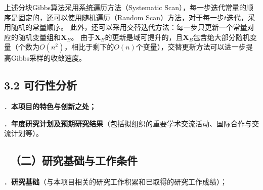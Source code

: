 \documentclass[12pt,UTF8,AutoFakeBold=3,a4paper]{ctexart} %
\begin{document}
上述分块Gibbs算法采用系统遍历方法（Systematic Scan），每一步迭代常量的顺序是固定的，还可以使用随机遍历（Random Scan）方法，对于每一步$t$迭代，采用随机的常量顺序。
此外，还可以采用交替迭代方法：每一步只更新一个常量对应的随机变量组和$\mathbf{X}_B$。
由于$\mathbf{X}_B$的更新是域可提升的，且$\mathbf{X}_B$包含绝大部分随机变量（个数为$O(n^2)$，相比于剩下的$O(n)$个变量），交替更新方法可以进一步提高Gibbs采样的收敛速度。


\subsection{3.2 可行性分析}





\vspace{0.5 \baselineskip}
{\sihao \color{MsBlue} ．{\bfseries 本项目的特色与创新之处；}}
\vspace{0.5 \baselineskip}


{\sihao \color{MsBlue} ．{\bfseries 年度研究计划及预期研究结果}（包括拟组织的重要学术交流活动、国际合作与交流计划等）。}

\subsubsection{{\kaishu {}}}
\subsubsection{{\kaishu {}}}
\subsubsection{{\kaishu {}}}

{\color{MsBlue} \subsection{\sihao \kaishu \quad \ （二）研究基础与工作条件 }}

{\sihao \color{MsBlue} ．{\bfseries 研究基础}（与本项目相关的研究工作积累和已取得的研究工作成绩）；}
\end{document}

